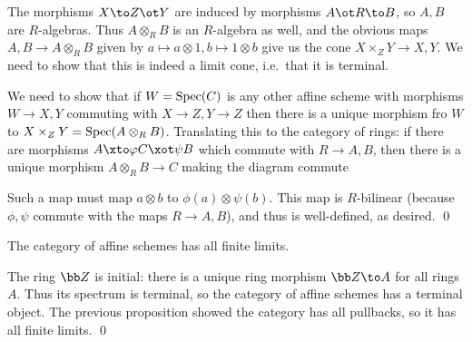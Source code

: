     The morphisms $X\to Z\ot Y$ are induced by morphisms $A\ot R\to B$, so $A,B$ are $R$-algebras.
    Thus $A\otimes_RB$ is an $R$-algebra as well, and the obvious maps $A,B\to A\otimes_RB$ given by $a\mapsto a\otimes1,b\mapsto1\otimes b$ give us the cone
    $X\times_ZY\to X,Y$.
    We need to show that this is indeed a limit cone, i.e.\ that it is terminal.

    We need to show that if $W={\rm Spec}(C)$ is any other affine scheme with morphisms $W\to X,Y$ commuting with $X\to Z,Y\to Z$ then there is a unique morphism fro $W$
    to $X\times_ZY={\rm Spec}(A\otimes_RB)$.
    Translating this to the category of rings: if there are morphisms $A\xto\phi C\xot\psi B$ which commute with $R\to A,B$, then there is a unique morphism $A\otimes_RB\to C$
    making the diagram commute

    \bigskip
    \centerline{}

    Such a map must map $a\otimes b$ to $\phi(a)\otimes\psi(b)$.
    This map is $R$-bilinear (because $\phi,\psi$ commute with the maps $R\to A,B$), and thus is well-defined, as desired.
    \qed

\eproof

\bcoro

    The category of affine schemes has all finite limits.

\ecoro

\bproof

    The ring $\bZ$ is initial: there is a unique ring morphism $\bZ\to A$ for all rings $A$.
    Thus its spectrum is terminal, so the category of affine schemes has a terminal object.
    The previous proposition showed the category has all pullbacks, so it has all finite limits.
    \qed

\eproof

